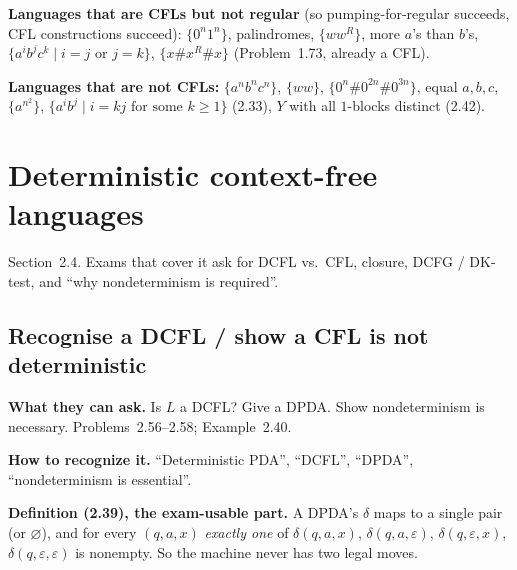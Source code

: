 \documentclass[11pt,a4paper]{article}
\newcommand{\eps}{\varepsilon}
\begin{document}
\textbf{Languages that are CFLs but not regular}
(so pumping-for-regular succeeds, CFL constructions succeed):
$\{0^n1^n\}$, palindromes, $\{ww^R\}$, more $a$'s than $b$'s,
$\{a^ib^jc^k\mid i=j\text{ or }j=k\}$,
$\{x\#x^R\#x\}$ (Problem~1.73, already a CFL).

\textbf{Languages that are not CFLs:}
$\{a^nb^nc^n\}$, $\{ww\}$, $\{0^n\#0^{2n}\#0^{3n}\}$,
equal $a,b,c$, $\{a^{n^2}\}$,
$\{a^ib^j\mid i=kj\text{ for some }k\ge 1\}$ (2.33),
$Y$ with all $1$-blocks distinct (2.42).

\section{Deterministic context-free languages}
\label{type:dcfl}

Section~2.4. Exams that cover it ask for DCFL vs.\ CFL,
closure, DCFG / DK-test, and ``why nondeterminism is required''.

\subsection{Recognise a DCFL / show a CFL is not deterministic}

\textbf{What they can ask.}
Is $L$ a DCFL? Give a DPDA. Show nondeterminism is necessary.
Problems~2.56--2.58; Example~2.40.

\textbf{How to recognize it.}
``Deterministic PDA'', ``DCFL'', ``DPDA'', ``nondeterminism is
essential''.

\textbf{Definition (2.39), the exam-usable part.}
A DPDA's $\delta$ maps to a single pair (or $\varnothing$), and
for every $(q,a,x)$ \emph{exactly one} of
$\delta(q,a,x)$, $\delta(q,a,\eps)$, $\delta(q,\eps,x)$,
$\delta(q,\eps,\eps)$ is nonempty. So the machine never has two
legal moves.
\end{document}
